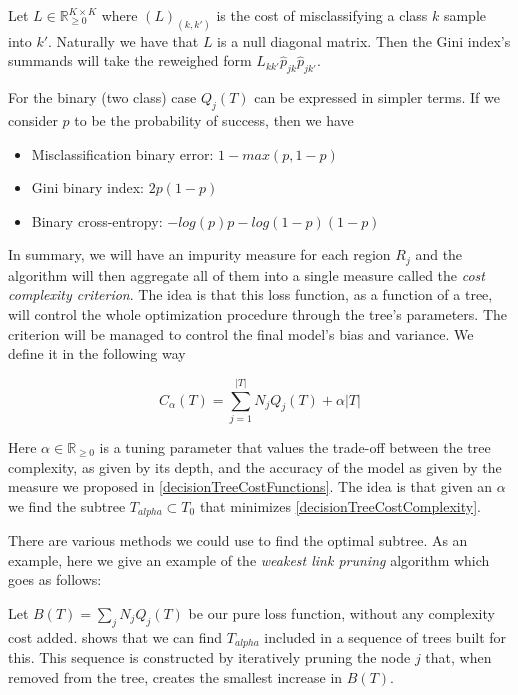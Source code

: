 Let $L \in \mathbb R_{\ge 0}^{K \times K}$ where $(L)_{(k,k')}$ is the cost of misclassifying a class $k$ sample into $k'$. Naturally we have that $L$ is a null diagonal matrix. Then the Gini index's summands will take the reweighed form $L_{kk'} \hat{p}_{jk} \hat{p}_{jk'}$.

For the binary (two class) case $Q_j(T)$ can be expressed in simpler terms. If we consider $p$ to be the probability of success, then we have

\begin{itemize}
\item Misclassification binary error: $1 - max(p, 1-p)$
\item Gini binary index: $ 2p(1-p) $
\item Binary cross-entropy: $ -log(p)p - log(1- p)(1-p) $
\end{itemize}\label{decisionTreeCostFunctions}

In summary, we will have an impurity measure for each region $R_j$ and the algorithm will then aggregate all of them into a single measure called the \textit{cost complexity criterion}. The idea is that this loss function, as a function of a tree, will control the whole optimization procedure through the tree's parameters. The criterion will be managed to control the final model's bias and variance. We define it in the following way

\begin{equation}
C_\alpha(T) = \sum_{j=1}^{|T|} N_j Q_j(T) + \alpha|T|
\end{equation}\label{decisionTreeCostComplexity}


Here $\alpha \in \mathbb{R}_{\geq 0}$ is a tuning parameter that values the trade-off between the tree complexity, as given by its depth, and the accuracy of the model as given by the measure we proposed in \cref{decisionTreeCostFunctions}. The idea is that given an $\alpha$ we find the subtree $T_{alpha} \subset T_0$ that minimizes \cref{decisionTreeCostComplexity}.

There are various methods we could use to find the optimal subtree. As an example, here we give an example of the \textit{weakest link pruning} algorithm which goes as follows:

Let $B(T) = \sum_{j} N_j Q_j(T) $ be our pure loss function, without any complexity cost added. \textcite{breiman-cart84} shows that we can find $T_{alpha}$ included in a sequence of trees built for this. This sequence is constructed by iteratively pruning the node $j$ that, when removed from the tree, creates the smallest increase in $B(T)$.

